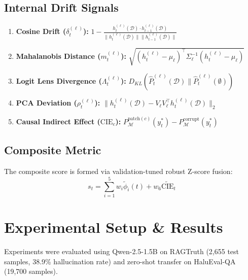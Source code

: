 \documentclass[10pt,twocolumn,a4paper]{article}
\begin{document}
\subsection{Internal Drift Signals}
\begin{enumerate}
    \item \textbf{Cosine Drift ($\delta_t^{(\ell)}$):} $1 - \frac{h_t^{(\ell)}(\mathcal{D}) \cdot h_{t-1}^{(\ell)}(\mathcal{D})}{\|h_t^{(\ell)}(\mathcal{D})\| \|h_{t-1}^{(\ell)}(\mathcal{D})\|}$
    \item \textbf{Mahalanobis Distance ($m_t^{(\ell)}$):} $\sqrt{(h_t^{(\ell)} - \mu_\ell)^\top \Sigma_\ell^{-1} (h_t^{(\ell)} - \mu_\ell)}$
    \item \textbf{Logit Lens Divergence ($\Lambda_t^{(\ell)}$):} $D_{KL}(\hat{P}_t^{(\ell)}(\mathcal{D}) \| \hat{P}_t^{(\ell)}(\emptyset))$
    \item \textbf{PCA Deviation ($\rho_t^{(\ell)}$):} $\|h_t^{(\ell)}(\mathcal{D}) - V_\ell V_\ell^\top h_t^{(\ell)}(\mathcal{D})\|_2$
    \item \textbf{Causal Indirect Effect ($\text{CIE}_c$):} $P_{\mathcal{M}}^{\text{patch}(c)}(y_t^*) - P_{\mathcal{M}}^{\text{corrupt}}(y_t^*)$
\end{enumerate}

\subsection{Composite Metric}
The composite score is formed via validation-tuned robust Z-score fusion:
\begin{equation}
s_t = \sum_{i=1}^5 w_i \tilde{\phi}_i(t) + w_6 \widetilde{\text{CIE}}_t
\end{equation}

\section{Experimental Setup \& Results}
Experiments were evaluated using Qwen-2.5-1.5B on RAGTruth (2,655 test samples, 38.9\% hallucination rate) and zero-shot transfer on HaluEval-QA (19,700 samples).
\end{document}
